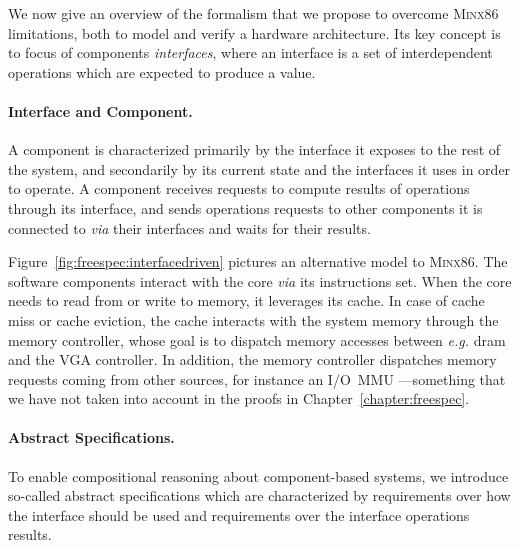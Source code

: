 We now give an overview of the formalism that we propose to overcome {\scshape
  Minx86} limitations, both to model and verify a hardware architecture.
%
Its key concept is to focus of components \emph{interfaces}, where an interface
is a set of interdependent operations which are expected to produce a value.

\paragraph{Interface and Component.}
%
A component is characterized primarily by the interface it exposes to the rest
of the system, and secondarily by its current state and the interfaces it uses
in order to operate.
%
A component receives requests to compute results of operations through its
interface, and sends operations requests to other components it is connected to
\emph{via} their interfaces and waits for their results.

\begin{example}
  Figure~\ref{fig:freespec:interfacedriven} pictures an alternative model to
  {\scshape Minx86}.
  The software components interact with the core \emph{via} its instructions
  set.
  When the core needs to read from or write to memory, it leverages its cache.
  In case of cache miss or cache eviction, the cache interacts with the system
  memory through the memory controller, whose goal is to dispatch memory
  accesses between \emph{e.g.} \ac{dram} and the VGA controller.
  In addition, the memory controller dispatches memory requests coming from
  other sources, for instance an I/O~MMU ---something that we have not taken
  into account in the proofs in Chapter~\ref{chapter:freespec}.
\end{example}

\paragraph{Abstract Specifications.}
%
To enable compositional reasoning about component-based systems, we introduce
so-called abstract specifications which are characterized by requirements over
how the interface should be used and requirements over the interface operations
results.

